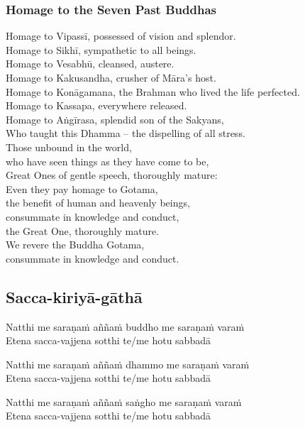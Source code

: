 
\subsubsection{Homage to the Seven Past Buddhas}


Homage to Vipassī, possessed of vision and splendor.\\
Homage to Sikhī, sympathetic to all beings.\\
Homage to Vesabhū, cleansed, austere.\\
Homage to Kakusandha, crusher of Māra's host.\\
Homage to Konāgamana, the Brahman who lived the life perfected.\\
Homage to Kassapa, everywhere released.\\
Homage to Aṅgīrasa, splendid son of the Sakyans,\\
Who taught this Dhamma -- the dispelling of all stress.\\
Those unbound in the world,\\\vin who have seen things as they have come to be,\\
Great Ones of gentle speech, thoroughly mature:\\
Even they pay homage to Gotama,\\\vin the benefit of human and heavenly beings,\\
consummate in knowledge and conduct,\\\vin the Great One, thoroughly mature.\\
We revere the Buddha Gotama,\\\vin consummate in knowledge and conduct.

\subsection{Sacca-kiriyā-gāthā}
\label{natthi-me}


Natthi me saraṇaṁ aññaṁ buddho me saraṇaṁ varaṁ\\
Etena sacca-vajjena sotthi te/me hotu sabbadā

Natthi me saraṇaṁ aññaṁ dhammo me saraṇaṁ varaṁ\\
Etena sacca-vajjena sotthi te/me hotu sabbadā

Natthi me saraṇaṁ aññaṁ saṅgho me saraṇaṁ varaṁ\\
Etena sacca-vajjena sotthi te/me hotu sabbadā

